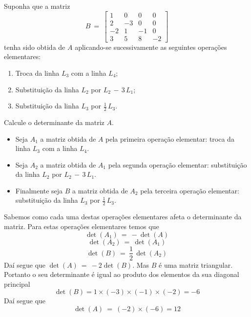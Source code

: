 \begin{problem}
Suponha que a matriz
$$B\ =\ \left[\begin{array}{rrrr}
  1 &  0 &  0 &  0 \\
  2 & -3 &  0 &  0  \\
 -2 &  1 &  -1 &  0 \\
  3 &  5 &  8 &  -2  \end{array}\right] $$
tenha sido obtida de $A$ aplicando-se sucessivamente as seguintes operações elementares:
\begin{enumerate}
\item[(a)] Troca da linha $L_3$ com a linha $L_4$;
\item[(b)] Substituição da linha $L_2$ por  $L_2\, -\, 3\, L_1$;
\item[(c)] Substituição da linha $L_3$ por $\displaystyle\frac{1}{2}\, L_3$.
\end{enumerate}
Calcule o determinante da matriz $A$.
\end{problem}
\begin{solution}
\begin{itemize}
\item Seja $A_1$ a matriz obtida de $A$ pela primeira operação elementar: 
 troca da linha $L_3$ com a linha $L_4$.
\item Seja $A_2$ a matriz obtida de $A_1$ pela segunda operação elementar:
substituição da linha $L_2$ por  $L_2\, -\, 3\, L_1$.
\item Finalmente seja $B$ a matriz obtida de $A_2$ pela terceira operação elementar: \linebreak
substituição da linha $L_3$ por $\displaystyle\frac{1}{2}\, L_3$.
\end{itemize}
Sabemos como cada uma destas operações elementares afeta o determinante da matriz.  Para estas
operações elementares temos que 
$$\det(A_1)\ =\ -\det(A)$$
$$\det(A_2)\ =\ \det(A_1)$$
$$\det(B)\ =\ \frac{1}{2}\,\det(A_2)$$
Daí segue que $\det(A)\ =\ -2 \det(B)$. Mas $B$ é uma matriz triangular. Portanto o seu determinante é igual ao produto dos elementos
da sua diagonal principal
$$\det(B)  = 1 \times (-3) \times (-1) \times (-2) = -6$$
Daí segue que 
$$\det(A)\ =\ (-2) \times (-6) = 12$$
\end{solution}

